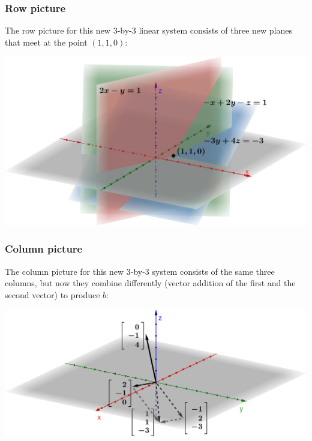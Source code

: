 \documentclass[../main.tex]{subfiles}
\begin{document}
\subsubsection{Row picture}
The row picture for this new 3-by-3 linear system consists of three new planes that meet at the point $(1, 1, 0)$:

\begingroup
\centering
\includegraphics[width = \columnwidth]{../figures/fig05_3d-row-pic02/geogebra-derived}
\par
\endgroup

\subsubsection{Column picture}
The column picture for this new 3-by-3 system consists of the same three columns, but now they combine differently (vector addition of the first and the second vector) to produce $b$:

\begingroup
\centering
\includegraphics[width = \columnwidth]{../figures/fig06_3d-col-pic02/geogebra-derived}
\par
\endgroup
\end{document}

